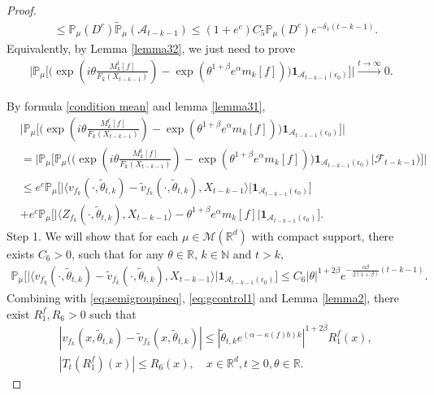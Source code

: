 \documentclass[12pt,oneside,english]{amsart}
\theoremstyle{plain}
\theoremstyle{definition}
\numberwithin{equation}{section}
\begin{document}
\begin{proof}
{\begin{align}
            &\leq \mathbb{P}_{\mu}(D^c)\mathbb{\tilde{P}}_{\mu}(\mathcal{A}_{t-k-1})\leq (1+e^c)C_5\mathbb{P}_{\mu}(D^c)e^{-\delta_1(t-k-1)}.
       \end{align}
       }
     Equivalently, by Lemma \ref{lemma32}, we just need to prove
     \begin{align}
        \Big|\mathbb{P}_{\mu}\Big[\big(\exp(i\theta \frac {M_k^t[f]}{F_k(X_{t-k-1})})-\exp(\theta^{1+\beta}e^{\alpha}m_k[f])\big)\mathbf{1}_{\mathcal{A}_{t-k-1}(\epsilon_0)}\Big]\Big|\xrightarrow{t\rightarrow\infty} 0.
    \end{align}
     
      By formula \eqref{condition mean} and lemma \ref{lemma31},
    \begin{align}
        &\Big|\mathbb{P}_{\mu}\Big[\big(\exp(i\theta \frac {M_k^t[f]}{F_k(X_{t-k-1})})-\exp(\theta^{1+\beta}e^{\alpha}m_k[f])\big)\mathbf{1}_{\mathcal{A}_{t-k-1}(\epsilon_0)}\Big]\Big|\\
        &=\Big|\mathbb{P}_{\mu}\Big[\mathbb{P}_{\mu}\Big(\big(\exp(i\theta \frac {M_k^t[f]}{F_k(X_{t-k-1})})-\exp(\theta^{1+\beta}e^{\alpha}m_k[f])\big)\mathbf{1}_{\mathcal{A}_{t-k-1}(\epsilon_0)}\Big|\mathscr{F}_{t-k-1}\Big)\Big]\Big|\\
        &\leq e^c\mathbb{P}_{\mu}\big[\big|\langle v_{f_k}(\cdot,\tilde{\theta}_{t,k})-\tilde{v}_{f_k}(\cdot,\tilde{\theta}_{t,k}), X_{t-k-1}\rangle\big|\mathbf{1}_{\mathcal{A}_{t-k-1}(\epsilon_0)}\big]\\
        \label{ineqinlem31}
        &+e^c\mathbb{P}_{\mu}\big[\big|\langle Z_{f_k}(\cdot,\tilde{\theta}_{t,k}),X_{t-k-1}\rangle-\theta^{1+\beta}e^{\alpha}m_k[f]\big|\mathbf{1}_{\mathcal{A}_{t-k-1}(\epsilon_0)}\big].
    \end{align}
Step 1.  We will show that for each $\mu \in\mathcal{M}(\mathbb{R}^d)$ with compact support, there exists $C_6>0$, such that for any $\theta\in \mathbb{R}$, $k\in\mathbb{N}$ and $t>k$,
    \begin{align}
    \label{lemma31q}
        \mathbb{P}_{\mu}\big[\big|\langle v_{f_k}(\cdot,\tilde{\theta}_{t,k})-\tilde{v}_{f_k}(\cdot,\tilde{\theta}_{t,k}), X_{t-k-1}\rangle\big|\mathbf{1}_{\mathcal{A}_{t-k-1}(\epsilon_0)}\big]\leq C_6|\theta|^{1+2\beta}e^{-\frac{\alpha\beta}{2(1+\beta)}(t-k-1)}.
    \end{align}
Combining with \eqref{eq:semigroupineq}, \eqref{eq:gcontrol1} and Lemma \ref{lemma2}, there exist $R_1^f,R_6>0$ such that
\begin{align}
    & |v_{f_k}(x,\tilde{\theta}_{t,k})-\tilde{v}_{f_k}(x,\tilde{\theta}_{t,k})|\leq |\tilde{\theta}_{t,k} e^{(\alpha-\kappa(f) b)k}|^{1+2\beta}R^f_1(x),\\
    & |T_t (R^f_1)(x)|\leq R_6(x), \quad x\in \mathbb{R}^d,t\geq 0, \theta \in \mathbb{R}.
\end{align}


\end{proof}
\end{document}
